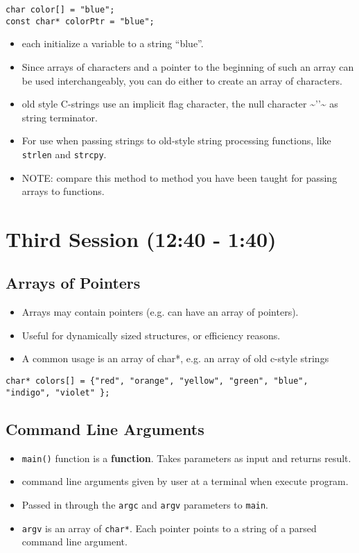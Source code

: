 \documentclass[11pt]{article}
\begin{document}
\begin{verbatim}
char color[] = "blue";
const char* colorPtr = "blue";
\end{verbatim}

\begin{itemize}
\item each initialize a variable to a string ``blue''.
\item Since arrays of characters and a pointer to the beginning of such an
  array can be used interchangeably, you can do either to create an
  array of characters.
\item old style C-strings use an implicit flag character, the null character \~{}'\0'\~{} as string terminator.
\item For use when passing strings to old-style string processing functions, like \verb~strlen~ and \verb~strcpy~.
\item NOTE: compare this method to method you have been taught for passing arrays to functions.
\end{itemize}
\section{Third Session (12:40 - 1:40)}
\label{sec-3}
\subsection{Arrays of Pointers}
\label{sec-3-1}

\begin{itemize}
\item Arrays may contain pointers (e.g. can have an array of pointers).
\item Useful for dynamically sized structures, or efficiency reasons.
\item A common usage is an array of char*, e.g. an array of old c-style strings
\end{itemize}


\begin{verbatim}
char* colors[] = {"red", "orange", "yellow", "green", "blue", "indigo", "violet" };
\end{verbatim}
\subsection{Command Line Arguments}
\label{sec-3-2}

\begin{itemize}
\item \verb~main()~ function is a \textbf{function}.  Takes parameters as input and returns result.
\item command line arguments given by user at a terminal when execute program.
\item Passed in through the \verb~argc~ and \verb~argv~ parameters to \verb~main~.
\item \verb~argv~ is an array of \verb~char*~.  Each pointer points to a string of a parsed command line argument.
\end{itemize}
\end{document}
